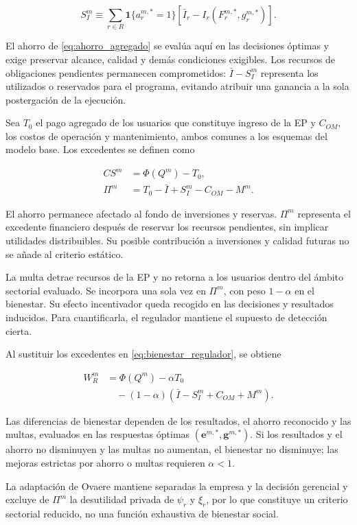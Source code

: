 \begin{equation}
\label{eq:ahorro_eficiencia_regulador}
S_I^m
\equiv
\sum_{r\in R}\mathbf{1}\{a_r^{m,*}=1\}
\left[\bar I_r-I_r(F_r^{m,*},g_r^{m,*})\right].
\end{equation}

El ahorro de \eqref{eq:ahorro_agregado} se evalúa aquí en las decisiones óptimas y exige preservar alcance, calidad y demás condiciones exigibles. Los recursos de obligaciones pendientes permanecen comprometidos: \(\bar I-S_I^m\) representa los utilizados o reservados para el programa, evitando atribuir una ganancia a la sola postergación de la ejecución.

Sea \(T_0\) el pago agregado de los usuarios que constituye ingreso de la EP y \(C_{OM}\), los costos de operación y mantenimiento, ambos comunes a los esquemas del modelo base. Los excedentes se definen como

\begin{align}
CS^m&=\Phi(Q^m)-T_0,
\label{eq:excedente_consumidor_regulador}\\
\Pi^m&=T_0-\bar I+S_I^m-C_{OM}-M^m.
\label{eq:excedente_productor_regulador}
\end{align}

El ahorro permanece afectado al fondo de inversiones y reservas. \(\Pi^m\) representa el excedente financiero después de reservar los recursos pendientes, sin implicar utilidades distribuibles. Su posible contribución a inversiones y calidad futuras no se añade al criterio estático.

La multa detrae recursos de la EP y no retorna a los usuarios dentro del ámbito sectorial evaluado. Se incorpora una sola vez en \(\Pi^m\), con peso \(1-\alpha\) en el bienestar. Su efecto incentivador queda recogido en las decisiones y resultados inducidos. Para cuantificarla, el regulador mantiene el supuesto de detección cierta.

Al sustituir los excedentes en \eqref{eq:bienestar_regulador}, se obtiene

\begin{equation}
\label{eq:bienestar_regulador_expandido}
\begin{aligned}
W_R^m
&=\Phi(Q^m)-\alpha T_0\\
&\quad-(1-\alpha)(\bar I-S_I^m+C_{OM}+M^m).
\end{aligned}
\end{equation}

Las diferencias de bienestar dependen de los resultados, el ahorro reconocido y las multas, evaluados en las respuestas óptimas \((\mathbf e^{m,*},\mathbf g^{m,*})\). Si los resultados y el ahorro no disminuyen y las multas no aumentan, el bienestar no disminuye; las mejoras estrictas por ahorro o multas requieren \(\alpha<1\).

La adaptación de Ovaere mantiene separadas la empresa y la decisión gerencial y excluye de \(\Pi^m\) la desutilidad privada de \(\psi_r\) y \(\xi_r\), por lo que constituye un criterio sectorial reducido, no una función exhaustiva de bienestar social.
